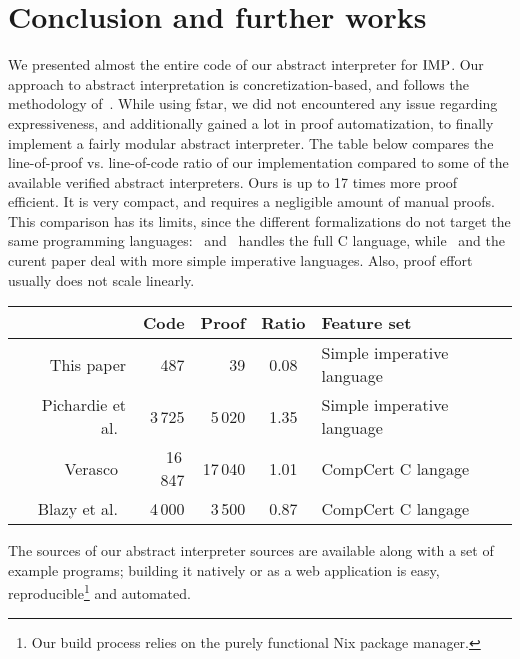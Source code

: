 \section{Conclusion and further works}%
\label{abint:section:conclusion}%

We presented almost the entire code of our abstract interpreter for $\textrm{IMP}{}$.
%
Our approach to abstract interpretation is concretization-based, and
follows the methodology of~\cite{SAS13:Blazy:al,POPL15:Jourdan:al}.
%
While using \gls{fstar}, we did not encountered any issue regarding
expressiveness, and additionally gained a lot in proof automatization,
to finally implement a fairly modular abstract interpreter.
The table below compares the line-of-proof vs. line-of-code ratio of
our implementation compared to some of the available verified abstract
interpreters.
%
Ours is up to 17 times more proof efficient.
%
It is very compact, and requires a negligible amount of manual proofs.
%
This comparison has its limits, since the different formalizations do
not target the same programming languages:~\cite{POPL15:Jourdan:al}
and~\cite{SAS13:Blazy:al} handles the full C language,
while~\cite{ITP10:Cachera:Pichardie} and the curent paper deal with
more simple imperative languages.
%
Also, proof effort usually does not scale linearly.

\begin{table}%
  \centering%
  \setlength{\tabcolsep}{2mm}
  \begin{tabular}{rrrcl}
     & Code & Proof & Ratio & Feature set\\
    \hline
    This paper
    & 487   & 39    & 0.08 & Simple imperative language
    \\
    Pichardie et al.~\cite{ITP10:Cachera:Pichardie}
    & 3\,725  & 5\,020  & 1.35 & Simple imperative language
    \\
    Verasco~\cite{POPL15:Jourdan:al}
    & 16\,847 & 17\,040 & 1.01 & CompCert C langage
    \\
    Blazy et al.~\cite{SAS13:Blazy:al}
    & 4\,000  & 3\,500  & 0.87 & CompCert C langage
  \end{tabular}%
\end{table}


The sources of our abstract interpreter sources are available along
with a set of example programs; building it natively or as a web
application is easy, reproducible\footnote{
  Our build process relies on the purely functional Nix package manager.%
} and automated.


